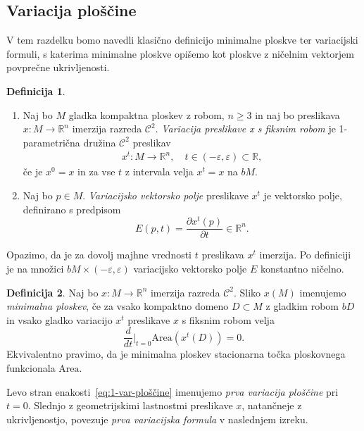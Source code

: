 \documentclass[12pt,a4paper,twoside]{article}
\theoremstyle{definition} %
\newtheorem{definicija}{Definicija}[section]
\theoremstyle{plain} %
\numberwithin{equation}{section}  %
\newcommand{\R}{\mathbb R}
\begin{document}
\subsection{Variacija ploščine}
V tem razdelku bomo navedli klasično definicijo minimalne ploskve ter variacijski formuli, s katerima minimalne ploskve opišemo kot ploskve z ničelnim vektorjem povprečne ukrivljenosti.
%
\begin{definicija}
\begin{enumerate}
\item
Naj bo $M$ gladka kompaktna ploskev z robom, $n \geq 3$ in naj bo preslikava $x \colon M \to \R^{n}$ imerzija razreda $\mathcal{C}^2$. \emph{Variacija preslikave x s fiksnim robom} je 1-parametrična družina $\mathcal{C}^2$ preslikav 
\begin{gather}
x^{t} \colon M \to \R^{n}, \quad t \in (-\varepsilon, \varepsilon) \subset \R,
\end{gather}
če je $x^0 = x$ in za vse $t$ z intervala velja $x^{t} = x$ na $bM$.
%
\item
Naj bo $p \in M$. \emph{Variacijsko vektorsko polje} preslikave $x^{t}$ je vektorsko polje, definirano s predpisom
\begin{equation}
E(p,t) = \frac{\partial{x^t(p)}}{\partial{t}} \in \R^{n}.
\end{equation}
\end{enumerate}
\end{definicija}

Opazimo, da je za dovolj majhne vrednosti $t$ preslikava $x^{t}$ imerzija.
Po definiciji je na množici $bM \times (-\varepsilon, \varepsilon)$ variacijsko vektorsko polje $E$ konstantno ničelno.

\begin{definicija}
Naj bo $x \colon M \to \R^{n}$ imerzija razreda $\mathcal{C}^2$. Sliko $x(M)$ imenujemo \emph{minimalna ploskev}, če za vsako kompaktno domeno $D \subset M$ z gladkim robom $bD$ in vsako gladko variacijo $x^{t}$ preslikave $x$ s fiksnim robom velja
\begin{equation} \label{eq:1-var-ploščine}
\frac{d}{dt} \Big|_{t=0} \text{Area} \left(x^{t}(D)\right) = 0.
\end{equation}
Ekvivalentno pravimo, da je minimalna ploskev stacionarna točka ploskovnega funkcionala $\text{Area}$.
\end{definicija}

Levo stran enakosti~\eqref{eq:1-var-ploščine} imenujemo \emph{prva variacija ploščine} pri $t=0$. Slednjo z geometrijskimi lastnostmi preslikave $x$, natančneje z ukrivljenostjo, povezuje \emph{prva variacijska formula} v naslednjem izreku. 
\end{document}
